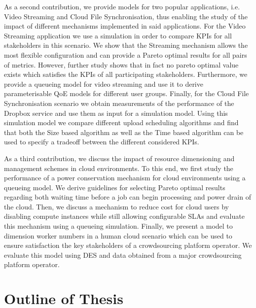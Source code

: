 As a second contribution, we provide models for two popular applications, i.e. Video Streaming and Cloud File Synchronisation, thus enabling the study of the impact of different mechanisms implemented in said applications.
For the Video Streaming application we use a simulation in order to compare \glspl{KPI} for all stakeholders in this scenario.
We show that the Streaming mechanism allows the most flexible configuration and can provide a Pareto optimal results for all pairs of metrics.
However, further study shows that in fact no pareto optimal value exists which satisfies the \glspl{KPI} of all participating stakeholders.
Furthermore, we provide a queueing model for video streaming and use it to derive parameterisable \gls{QoE} models for different user groups.
Finally, for the Cloud File Synchronisation scenario we obtain measurements of the performance of the Dropbox service and use them as input for a simulation model.
Using this simulation model we compare different upload scheduling algorithms and find that both the Size based algorithm as well as the Time based algorithm can be used to specify a tradeoff between the different considered \glspl{KPI}.

As a third contribution, we discuss the impact of resource dimensioning and management schemes in cloud environments.
To this end, we first study the performance of a power conservation mechanism for cloud environments using a queueing model.
We derive guidelines for selecting Pareto optimal results regarding both waiting time before a job can begin processing and power drain of the cloud.
Then, we discuss a mechanism to reduce cost for cloud users by disabling compute instances while still allowing configurable \glspl{SLA} and evaluate this mechanism using a queueing simulation.
Finally, we present a model to dimension worker numbers in a human cloud scenario which can be used to ensure satisfaction the key stakeholders of a crowdsourcing platform operator.
We evaluate this model using \gls{DES} and data obtained from a major crowdsourcing platform operator. 

\section{Outline of Thesis}\label{sec:introduction:outline}

